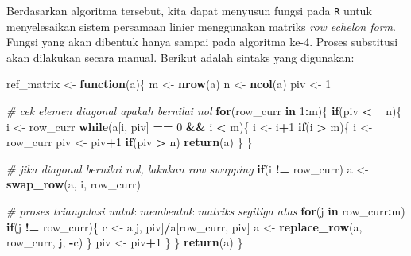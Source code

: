 \documentclass[]{book}
\newenvironment{Shaded}{\begin{snugshade}}{\end{snugshade}}
\newcommand{\CommentTok}[1]{\textcolor[rgb]{0.56,0.35,0.01}{\textit{#1}}}
\newcommand{\ControlFlowTok}[1]{\textcolor[rgb]{0.13,0.29,0.53}{\textbf{#1}}}
\newcommand{\DecValTok}[1]{\textcolor[rgb]{0.00,0.00,0.81}{#1}}
\newcommand{\KeywordTok}[1]{\textcolor[rgb]{0.13,0.29,0.53}{\textbf{#1}}}
\newcommand{\NormalTok}[1]{#1}
\newcommand{\OperatorTok}[1]{\textcolor[rgb]{0.81,0.36,0.00}{\textbf{#1}}}
\newcommand{\StringTok}[1]{\textcolor[rgb]{0.31,0.60,0.02}{#1}}
\theoremstyle{definition}
\theoremstyle{definition}
\theoremstyle{definition}
\theoremstyle{remark}
\begin{document}
Berdasarkan algoritma tersebut, kita dapat menyusun fungsi pada \texttt{R} untuk menyelesaikan sistem persamaan linier menggunakan matriks \emph{row echelon form}. Fungsi yang akan dibentuk hanya sampai pada algoritma ke-4. Proses substitusi akan dilakukan secara manual. Berikut adalah sintaks yang digunakan:

\begin{Shaded}
\begin{Highlighting}[]
\NormalTok{ref_matrix <-}\StringTok{ }\ControlFlowTok{function}\NormalTok{(a)\{}
\NormalTok{  m <-}\StringTok{ }\KeywordTok{nrow}\NormalTok{(a)}
\NormalTok{  n <-}\StringTok{ }\KeywordTok{ncol}\NormalTok{(a)}
\NormalTok{  piv <-}\StringTok{ }\DecValTok{1}
  
\CommentTok{# cek elemen diagonal apakah bernilai nol}
  \ControlFlowTok{for}\NormalTok{(row_curr }\ControlFlowTok{in} \DecValTok{1}\OperatorTok{:}\NormalTok{m)\{}
    \ControlFlowTok{if}\NormalTok{(piv }\OperatorTok{<=}\StringTok{ }\NormalTok{n)\{}
\NormalTok{      i <-}\StringTok{ }\NormalTok{row_curr}
      \ControlFlowTok{while}\NormalTok{(a[i, piv] }\OperatorTok{==}\StringTok{ }\DecValTok{0} \OperatorTok{&&}\StringTok{ }\NormalTok{i }\OperatorTok{<}\StringTok{ }\NormalTok{m)\{}
\NormalTok{        i <-}\StringTok{ }\NormalTok{i}\OperatorTok{+}\DecValTok{1}
        \ControlFlowTok{if}\NormalTok{(i }\OperatorTok{>}\StringTok{ }\NormalTok{m)\{}
\NormalTok{          i <-}\StringTok{ }\NormalTok{row_curr}
\NormalTok{          piv <-}\StringTok{ }\NormalTok{piv}\OperatorTok{+}\DecValTok{1}
          \ControlFlowTok{if}\NormalTok{(piv }\OperatorTok{>}\StringTok{ }\NormalTok{n)}
            \KeywordTok{return}\NormalTok{(a)}
\NormalTok{        \}}
\NormalTok{      \}}
      
\CommentTok{# jika diagonal bernilai nol, lakukan row swapping}
    \ControlFlowTok{if}\NormalTok{(i }\OperatorTok{!=}\StringTok{ }\NormalTok{row_curr)}
\NormalTok{      a <-}\StringTok{ }\KeywordTok{swap_row}\NormalTok{(a, i, row_curr)}
    
\CommentTok{# proses triangulasi untuk membentuk matriks segitiga atas}
    \ControlFlowTok{for}\NormalTok{(j }\ControlFlowTok{in}\NormalTok{ row_curr}\OperatorTok{:}\NormalTok{m)}
      \ControlFlowTok{if}\NormalTok{(j }\OperatorTok{!=}\StringTok{ }\NormalTok{row_curr)\{}
\NormalTok{        c <-}\StringTok{ }\NormalTok{a[j, piv]}\OperatorTok{/}\NormalTok{a[row_curr, piv]}
\NormalTok{        a <-}\StringTok{ }\KeywordTok{replace_row}\NormalTok{(a, row_curr, j, }\OperatorTok{-}\NormalTok{c)}
\NormalTok{      \}}
\NormalTok{    piv <-}\StringTok{ }\NormalTok{piv}\OperatorTok{+}\DecValTok{1}
\NormalTok{    \}}
\NormalTok{  \}}
  \KeywordTok{return}\NormalTok{(a)}
\NormalTok{\}}
\end{Highlighting}
\end{Shaded}
\end{document}
